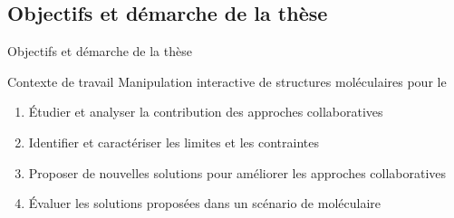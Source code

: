 \documentclass[english,french,dvips,10pt]{mybeamer}
\begin{document}
	\subsection{Objectifs et démarche de la thèse}
	\begin{myframe}{Objectifs et démarche de la thèse}
		\begin{myblock}{Contexte de travail}
			Manipulation interactive de structures moléculaires pour le \mydocking
		\end{myblock}
		\vfill
		\begin{enumerate}
			\item Étudier et analyser la contribution des approches collaboratives
				\vfill
			\item Identifier et caractériser les limites et les contraintes
				\vfill
			\item Proposer de nouvelles solutions pour améliorer les approches collaboratives
				\vfill
			\item Évaluer les solutions proposées dans un scénario de \mydocking moléculaire
		\end{enumerate}
		\vfill
	\end{myframe}
\end{document}
